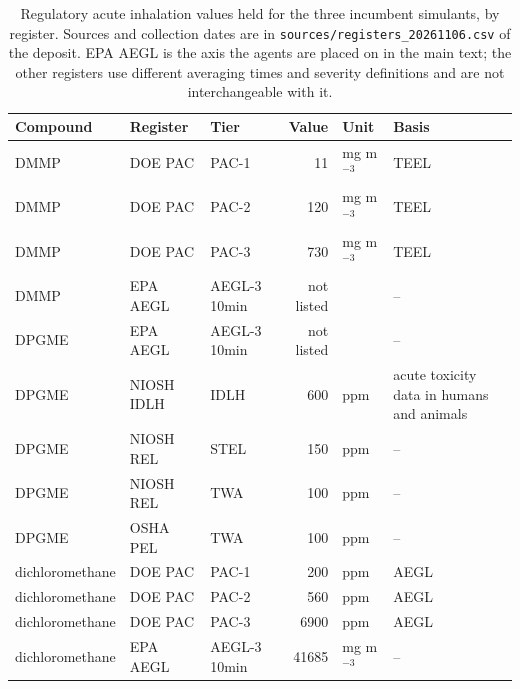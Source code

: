 \begin{table}[htb]
\centering
\caption{Regulatory acute inhalation values held for the three incumbent simulants, by register. Sources and collection dates are in \texttt{sources/registers\_20261106.csv} of the deposit. EPA AEGL is the axis the agents are placed on in the main text; the other registers use different averaging times and severity definitions and are not interchangeable with it.}
\label{tab:registers}
\footnotesize
\setlength{\tabcolsep}{3pt}
\begin{tabular}{lllrll}
\hline
Compound & Register & Tier & Value & Unit & Basis \\
\hline
DMMP & DOE PAC & PAC-1 & 11 & mg m$^{-3}$ & TEEL \\
DMMP & DOE PAC & PAC-2 & 120 & mg m$^{-3}$ & TEEL \\
DMMP & DOE PAC & PAC-3 & 730 & mg m$^{-3}$ & TEEL \\
DMMP & EPA AEGL & AEGL-3 10min & not listed &  & -- \\
DPGME & EPA AEGL & AEGL-3 10min & not listed &  & -- \\
DPGME & NIOSH IDLH & IDLH & 600 & ppm & acute toxicity data in humans and animals \\
DPGME & NIOSH REL & STEL & 150 & ppm & -- \\
DPGME & NIOSH REL & TWA & 100 & ppm & -- \\
DPGME & OSHA PEL & TWA & 100 & ppm & -- \\
dichloromethane & DOE PAC & PAC-1 & 200 & ppm & AEGL \\
dichloromethane & DOE PAC & PAC-2 & 560 & ppm & AEGL \\
dichloromethane & DOE PAC & PAC-3 & 6900 & ppm & AEGL \\
dichloromethane & EPA AEGL & AEGL-3 10min & 41685 & mg m$^{-3}$ & -- \\
\hline
\end{tabular}
\end{table}
